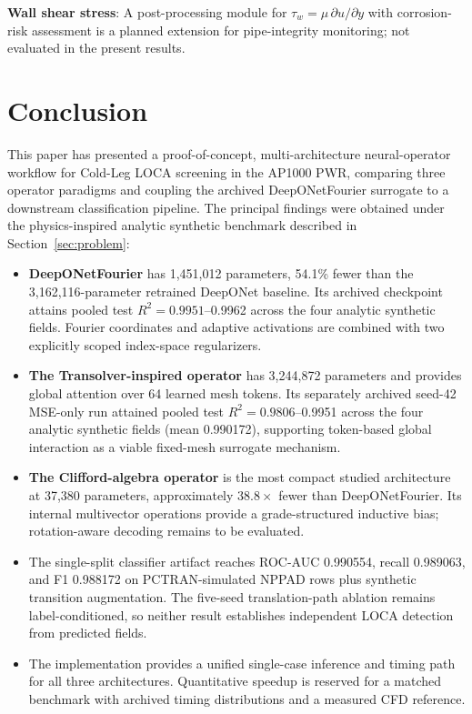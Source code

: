 \documentclass[journal]{IEEEtran}
\newcommand{\added}[1]{#1}
\begin{document}
\textbf{Wall shear stress}: A post-processing module for $\tau_w = \mu\,\partial u/\partial y$ with corrosion-risk assessment is a planned extension for pipe-integrity monitoring; not evaluated in the present results.

\section{Conclusion}
\label{sec:conclusion}

\added{This paper has presented a proof-of-concept, multi-architecture neural-operator workflow for Cold-Leg LOCA screening in the AP1000 PWR, comparing three operator paradigms and coupling the archived DeepONetFourier surrogate to a downstream classification pipeline. The principal findings were obtained under the physics-inspired analytic synthetic benchmark described in Section~\ref{sec:problem}:}

\begin{itemize}
    \item \added{\textbf{DeepONetFourier} has 1,451,012 parameters, 54.1\% fewer than the 3,162,116-parameter retrained DeepONet baseline. Its archived checkpoint attains pooled test $R^2=0.9951$--0.9962 across the four analytic synthetic fields. Fourier coordinates and adaptive activations are combined with two explicitly scoped index-space regularizers.}
    \item \added{\textbf{The Transolver-inspired operator} has 3,244,872 parameters and provides global attention over 64 learned mesh tokens. Its separately archived seed-42 MSE-only run attained pooled test $R^2=0.9806$--0.9951 across the four analytic synthetic fields (mean 0.990172), supporting token-based global interaction as a viable fixed-mesh surrogate mechanism.}
    \item \added{\textbf{The Clifford-algebra operator} is the most compact studied architecture at 37,380 parameters, approximately $38.8\times$ fewer than DeepONetFourier. Its internal multivector operations provide a grade-structured inductive bias; rotation-aware decoding remains to be evaluated.}
    \item The single-split classifier artifact reaches ROC-AUC 0.990554, recall 0.989063, and F1 0.988172 on PCTRAN-simulated NPPAD rows plus synthetic transition augmentation. The five-seed translation-path ablation remains label-conditioned, so neither result establishes independent LOCA detection from predicted fields.
    \item \added{The implementation provides a unified single-case inference and timing path for all three architectures. Quantitative speedup is reserved for a matched benchmark with archived timing distributions and a measured CFD reference.}
\end{itemize}
\end{document}
